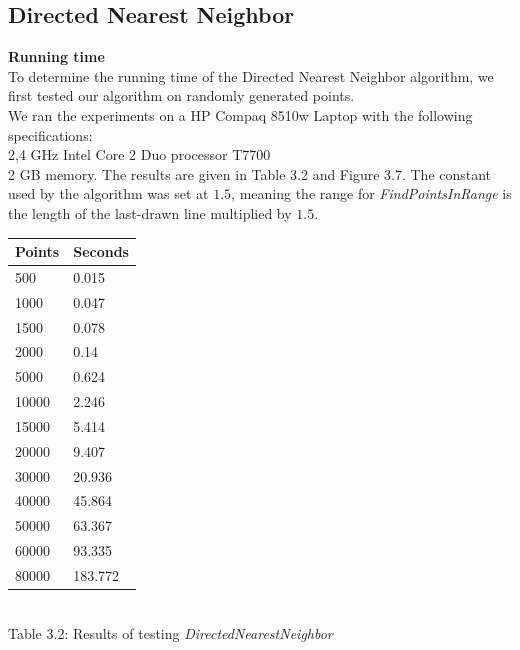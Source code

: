     \subsection{Directed Nearest Neighbor}
  \label{sub:dnn_test_results}
    \textbf{Running time}\\
        To determine the running time of the Directed Nearest Neighbor algorithm, we first tested our algorithm on randomly generated points.\\
        We ran the experiments on a HP Compaq 8510w Laptop with the following specifications:\\
        2,4 GHz Intel Core 2 Duo processor T7700\\
        2 GB memory.
        The results are given in Table 3.2 and Figure 3.7. The constant used by the algorithm was set at $1.5$, meaning the range for \textit{FindPointsInRange} is the length of the last-drawn line multiplied by $1.5$.

        \begin{center}
          \begin{tabular}{|p{2.5cm}|p{2.5cm}|}
              \hline
              Points & Seconds\\
              \hline
              \hline
              500 & 0.015\\
              \hline
              1000 & 0.047\\
              \hline
              1500 & 0.078\\
              \hline
              2000 & 0.14\\
              \hline
              5000 & 0.624\\
              \hline
              10000 & 2.246\\
              \hline
              15000 & 5.414\\
              \hline
              20000 & 9.407\\
              \hline
              30000 & 20.936\\
              \hline
              40000 & 45.864\\
              \hline
              50000 & 63.367\\
              \hline
              60000 & 93.335\\
              \hline
              80000 & 183.772\\
              \hline
          \end{tabular}
          \label{tab:dnn_runningtime}\\
          Table 3.2: Results of testing \textit{DirectedNearestNeighbor}
        \end{center}

